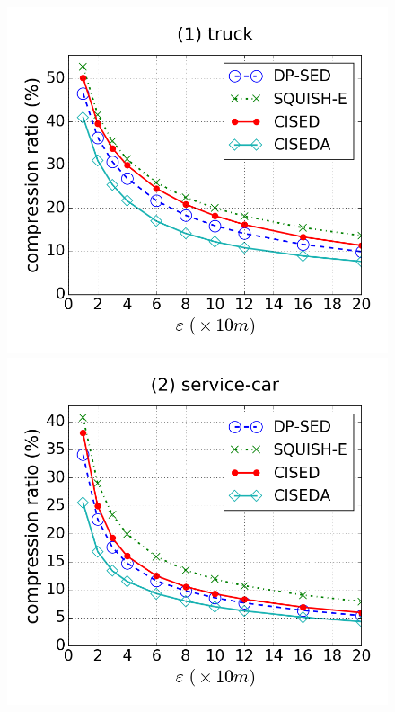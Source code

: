 \begin{figure}[tb!]
\centering
\includegraphics[scale = 0.245]{figures/Exp-cr-epsilon-truck.png}
\includegraphics[scale = 0.245]{figures/Exp-cr-epsilon-service.png}

\end{figure}
